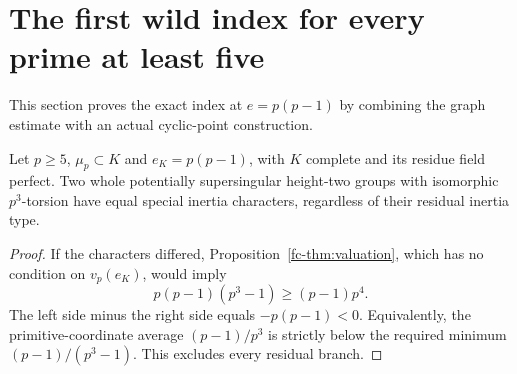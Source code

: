 \section{The first wild index for every prime at least five}\label{sec:first-wild-general}
This section proves the exact index at $e=p(p-1)$ by combining the graph estimate with an actual cyclic-point construction.

\begin{proposition}\label{prop:first-wild-ss}
Let $p\ge5$, $\mu_p\subset K$ and $e_K=p(p-1)$, with $K$ complete and its residue field perfect. Two whole potentially supersingular height-two groups with isomorphic $p^3$-torsion have equal special inertia characters, regardless of their residual inertia type.
\end{proposition}
\begin{proof}
If the characters differed, Proposition~\ref{fc-thm:valuation}, which has no condition on $v_p(e_K)$, would imply
\[
                    p(p-1)(p^3-1)\ge(p-1)p^4.
\]
The left side minus the right side equals $-p(p-1)<0$. Equivalently, the primitive-coordinate average $(p-1)/p^3$ is strictly below the required minimum $(p-1)/(p^3-1)$. This excludes every residual branch.
\end{proof}

